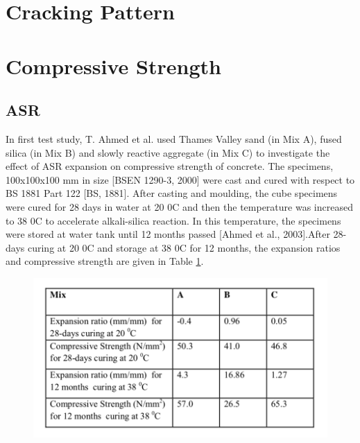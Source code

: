 \section{Cracking Pattern}


\section{Compressive Strength}

\subsection{ASR}



In first test study, T. Ahmed et al. used Thames Valley sand (in Mix A), fused silica (in Mix B) and slowly reactive aggregate (in Mix C) to investigate the effect of ASR expansion on compressive strength of concrete. The specimens, 100x100x100 mm in size [BSEN 1290-3, 2000] were cast and cured with respect to BS 1881 Part 122 [BS, 1881]. After casting and moulding, the cube specimens were cured for 28 days in water at 20 0C and then the temperature was increased to 38 0C to accelerate alkali-silica reaction. In this temperature, the specimens were stored at water tank until 12 months passed [Ahmed et al., 2003].After 28-days curing at 20 0C and storage at 38 0C for 12 months, the expansion ratios and compressive strength are given in Table \ref{}.


\begin{figure}
  \includegraphics{Reference/temp1.png}
  \caption{}
  \label{}
\end{figure}

